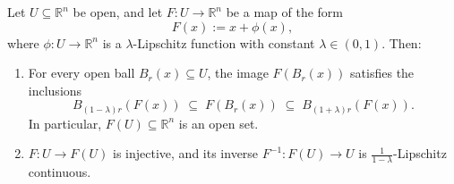 \begin{lemma}
\label{lem:lipschitz_perturbation_identity}
Let $U \subseteq \mathbb{R}^n$ be open, and let $F : U \to \mathbb{R}^n$ be a map of the form
\[
F(x) := x + \phi(x),
\]
where $\phi : U \to \mathbb{R}^n$ is a $\lambda$-Lipschitz function with constant $\lambda \in (0,1)$. Then:
\begin{enumerate}[label=\textbf{(\alph*)}]
  \item For every open ball $B_r(x) \subseteq U$, the image $F(B_r(x))$ satisfies the inclusions
    \[
    B_{(1-\lambda)r}(F(x)) \;\subseteq\; F(B_r(x)) \;\subseteq\; B_{(1+\lambda)r}(F(x)).
    \]
    In particular, $F(U) \subseteq \mathbb{R}^n$ is an open set.
  \item $F : U \to F(U)$ is injective, and its inverse $F^{-1} : F(U) \to U$ is $\frac{1}{1-\lambda}$-Lipschitz continuous.
\end{enumerate}
\end{lemma}

